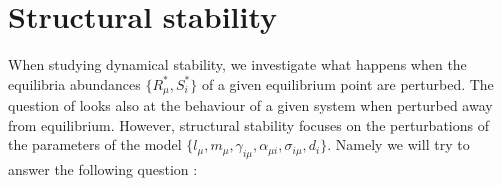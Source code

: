 \documentclass[12pt, titlepage]{report}
\begin{document}
%
\newpage
\section{Structural stability}\label{sec : structural stability intro}
When studying dynamical stability, we investigate what happens when the equilibria abundances $\{R^*_\mu, S^*_i\}$ of a given equilibrium point are perturbed. The question of  looks also at the behaviour of a given system when perturbed away from equilibrium. However, structural stability focuses on the perturbations of the parameters of the model \ie  $\{l_\mu, m_\mu, \gamma_{i\mu}, \alpha_{\mu i}, \sigma_{i\mu},d_i\}$. Namely we will try to answer the following question :

\begin{centering}
\end{centering}
\end{document}
